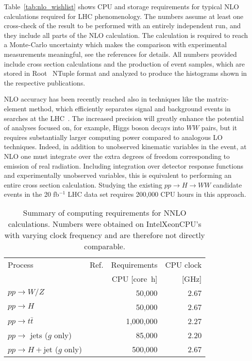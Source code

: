 Table~\ref{tab:nlo_wishlist} shows CPU and storage requirements for 
typical NLO calculations required for LHC phenomenology. The numbers assume
at least one cross-check of the result to be performed with an entirely
independent run, and they include all parts of the NLO calculation.
The calculation is required to reach a Monte-Carlo uncertainty which makes 
the comparison with experimental measurements meaningful, see the
references for details. All numbers provided include cross section
calculations and the production of event samples, which are stored
in Root~\cite{Brun:1997pa} NTuple format and analyzed to produce the
histograms shown in the respective publications.

NLO accuracy has been recently reached also in techniques like the 
matrix-element method, which efficiently separates signal and background
events in searches at the LHC~\cite{Campbell:2012cz}.
The increased precision will greatly enhance the potential of analyses
focused on, for example, Higgs boson decays into $WW$ pairs, 
but it requires substantially larger computing power compared
to analogous LO techniques. Indeed, in addition to unobserved kinematic 
variables in the event, at NLO one must integrate over the extra degrees 
of freedom corresponding to emission of real radiation. 
Including integration over detector response functions and experimentally 
unobserved variables, this is equivalent to performing an entire 
cross section calculation. Studying the existing $pp\to H\to WW$ 
candidate events in the 20 fb$^{-1}$ LHC data set requires 200,000 
CPU hours in this approach.

\begin{table}
  \centering
  \begin{tabular}{llrr}
    \hline
    Process & Ref. & Requirements & CPU clock\\
    & & CPU [core~h] & [GHz]\\
    \hline\hline
    $pp\to W/Z$ & \cite{Melnikov:2006di,Li:2012wna} & 50,000 & 2.67 \\
    $pp\to H$ & \cite{Anastasiou:2005qj} & 50,000 & 2.67 \\
    $pp\to t\bar{t}$ & \cite{Baernreuther:2012ws,Czakon:2013goa} & 1,000,000 & 2.27\\
    $pp\to $ jets ($g$ only) & \cite{Ridder:2013mf} & 85,000 & 2.20 \\
    $pp\to H+$jet ($g$ only) & \cite{Boughezal:2013uia} & 500,000 & 2.67 \\
    \hline
  \end{tabular}
  \caption{Summary of computing requirements for NNLO calculations.
    Numbers were obtained on Intel\registered Xeon\registered CPU's with
    varying clock frequency and are therefore not directly comparable.
    \label{tab:nnlo_requirements}}
\end{table}

